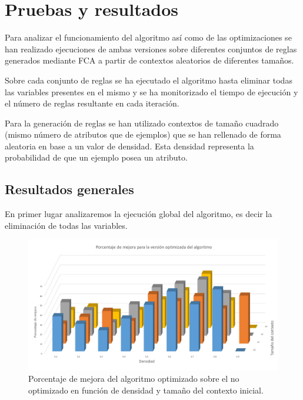 \chapter*{Pruebas y resultados}
	
	Para analizar el funcionamiento del algoritmo así como de las optimizaciones se han realizado ejecuciones de ambas versiones sobre diferentes conjuntos de reglas generados mediante FCA a partir de contextos aleatorios de diferentes tamaños. 
	
	Sobre cada conjunto de reglas se ha ejecutado el algoritmo hasta eliminar todas las variables presentes en el mismo y se ha monitorizado el tiempo de ejecución y el número de reglas resultante en cada iteración.	
	
	Para la generación de reglas se han utilizado contextos de tamaño cuadrado (mismo número de atributos que de ejemplos) que se han rellenado de forma aleatoria en base a un valor de densidad. Esta densidad representa la probabilidad de que un ejemplo posea un atributo.

\newpage

\section*{Resultados generales}

	En primer lugar analizaremos la ejecución global del algoritmo, es decir la eliminación de todas las variables. 
	
	\begin{figure}[h]
	
		\includegraphics[width=1\linewidth]{05_Pruebas/graficas/general}
		\caption{Porcentaje de mejora del algoritmo optimizado sobre el no optimizado en función de densidad y tamaño del contexto inicial.}
		\label{fig:general}
	\end{figure}
	
